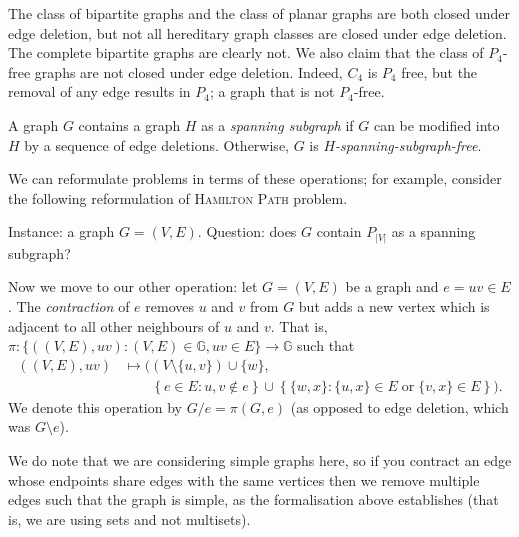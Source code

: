 \begin{example}
  The class of bipartite graphs and the class of planar graphs are both closed under edge deletion, but not all hereditary graph classes are closed under edge deletion. The complete bipartite graphs are clearly not. We also claim that the class of $P_4$-free graphs are not closed under edge deletion. Indeed, $C_4$ is $P_4$ free, but the removal of any edge results in $P_4$; a graph that is not $P_4$-free.
\end{example}

\begin{definition}
  A graph $G$ contains a graph $H$ as a \emph{spanning subgraph} if $G$ can be modified into $H$ by a sequence of edge deletions. Otherwise, $G$ is \emph{$H$-spanning-subgraph-free}.
\end{definition}

We can reformulate problems in terms of these operations; for example, consider the following reformulation of \textsc{Hamilton Path} problem.

\begin{problem}
Instance: a graph $G = (V,E)$. \newline
Question: does $G$ contain $P_{\lvert V \rvert}$ as a spanning subgraph?
\end{problem}

Now we move to our other operation: let $G = (V,E)$ be a graph and $e = uv \in E$. The \emph{contraction} of $e$ removes $u$ and $v$ from $G$ but adds a new vertex which is adjacent to all other neighbours of $u$ and $v$. That is, $\pi: \{((V,E), uv): (V,E) \in \mathbb G, uv \in E\} \to \mathbb G$ such that
\begin{align*}
  ((V,E), uv) & \mapsto ((V \setminus \{u, v\})\cup \{w\},                                                                            \\
              & \qquad\left\{e \in E: u,v \not\in e \right\} \cup \left\{\{w,x\}: \{u,x\} \in E \;\text{or}\; \{v,x\} \in E\right\}).
\end{align*}
We denote this operation by $G/e = \pi(G, e)$ (as opposed to edge deletion, which was $G\setminus e$).

We do note that we are considering simple graphs here, so if you contract an edge whose endpoints share edges with the same vertices then we remove multiple edges such that the graph is simple, as the formalisation above establishes (that is, we are using sets and not multisets).

